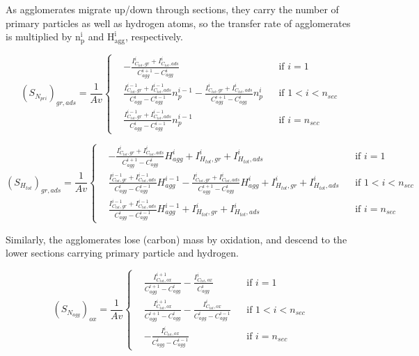 As agglomerates migrate up/down through sections, they carry the number of primary particles as well as hydrogen atoms, so the transfer rate of agglomerates is multiplied by $\mathrm{n^i_p}$ and $\mathrm{H^i_{agg}}$, respectively. 

\begin{equation}
	\left(S_{N_{pri}}\right)_{gr, ads}=
	\frac{1}{Av}
	\left\{
	\begin{aligned}
		&-\frac{I^i_{C_{tot},gr}+I^i_{C_{tot},ads}}{C^{i+1}_{agg}-C^{i}_{agg}}
		&&
		\text{if } i = 1
		\\
		&\frac{I^{i-1}_{C_{tot},gr}+I^{i-1}_{C_{tot},ads}}{C^{i}_{agg}-C^{i-1}_{agg}}n^{i-1}_p
		-\frac{I^{i}_{C_{tot},gr}+I^{i}_{C_{tot},ads}}{C^{i+1}_{agg}-C^{i}_{agg}}n^{i}_p
		&&
		\text{if } 1 < i < n_{sec}
		\\
		&\frac{I^{i-1}_{C_{tot},gr}+I^{i-1}_{C_{tot},ads}}{C^{i}_{agg}-C^{i-1}_{agg}}n^{i-1}_p
		&&\text{if } i=n_{sec}
	\end{aligned}
	\right.
	\label{eqn:S_Npri_gradssect}
\end{equation}

\begin{equation}
	\left(S_{H_{tot}}\right)_{gr, ads}=
	\frac{1}{Av}
	\left\{
	\begin{aligned}
		&-\frac{I^i_{C_{tot},gr}+I^i_{C_{tot},ads}}{C^{i+1}_{agg}-C^{i}_{agg}}H^{i}_{agg} 
		+ I^{i}_{H_{tot}, gr} + I^{i}_{H_{tot}, ads}
		&&
		\text{if } i = 1
		\\
		&\frac{I^{i-1}_{C_{tot},gr}+I^{i-1}_{C_{tot},ads}}{C^{i}_{agg}-C^{i-1}_{agg}}H^{i-1}_{agg}
		-\frac{I^{i}_{C_{tot},gr}+I^{i}_{C_{tot},ads}}{C^{i+1}_{agg}-C^{i}_{agg}}H^{i}_{agg}
		+ I^{i}_{H_{tot}, gr} + I^{i}_{H_{tot}, ads}
		&&
		\text{if } 1 < i < n_{sec}
		\\
		&\frac{I^{i-1}_{C_{tot},gr}+I^{i-1}_{C_{tot},ads}}{C^{i}_{agg}-C^{i-1}_{agg}}H^{i-1}_{agg}
		+ I^{i}_{H_{tot}, gr} + I^{i}_{H_{tot}, ads}
		&&\text{if } i=n_{sec}
	\end{aligned}
	\right.
	\label{eqn:S_Htot_gradssect}
\end{equation}

Similarly, the agglomerates lose (carbon) mass by oxidation, and descend to the lower sections carrying primary particle and hydrogen.

\begin{equation}
	\left(S_{N_{agg}}\right)_{ox}=
	\frac{1}{Av}
	\left\{
	\begin{aligned}
		&\frac{I^{i+1}_{C_{tot},ox}}{C^{i+1}_{agg}-C^{i}_{agg}}
		-
		\frac{I^{i}_{C_{tot},ox}}{C^{i}_{agg}}
		&&
		\text{if } i = 1
		\\
		&\frac{I^{i+1}_{C_{tot},ox}}{C^{i+1}_{agg}-C^{i}_{agg}}
		-
		\frac{I^{i}_{C_{tot},ox}}{C^{i}_{agg}-C^{i-1}_{agg}}
		&&
		\text{if } 1 < i < n_{sec}
		\\
		&
		-
		\frac{I^{i}_{C_{tot},ox}}{C^{i}_{agg}-C^{i-1}_{agg}}
		&&\text{if } i=n_{sec}
	\end{aligned}
	\right.
	\label{eqn:S_Nagg_oxsect}
\end{equation}

